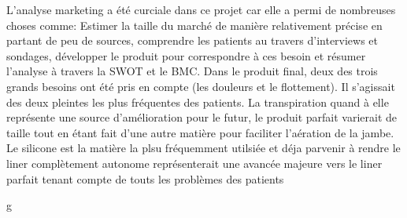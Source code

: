 L'analyse marketing a été curciale dans ce projet car elle a permi de nombreuses choses comme: Estimer la taille du marché de manière relativement précise en partant de peu de sources, comprendre les patients au travers d'interviews et sondages, développer le produit pour correspondre à ces besoin et résumer l'analyse à travers la SWOT et le BMC. Dans le produit final, deux des trois grands besoins ont été pris en compte (les douleurs et le flottement). Il s'agissait des deux pleintes les plus fréquentes des patients. La transpiration quand à elle représente une source d'amélioration pour le futur, le produit parfait varierait de taille tout en étant fait d'une autre matière pour faciliter l'aération de la jambe. Le silicone est la matière la plsu fréquemment utilsiée et déja parvenir à rendre le liner complètement autonome représenterait une avancée majeure vers le liner parfait tenant compte de touts les problèmes des patients



\newpage
g
\newpage
